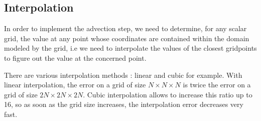 \documentclass[accepted,single]{gipaper}
\begin{document}
\subsection{Interpolation}


In order to implement the advection step, we need to determine, for any scalar grid, the value at any point whose coordinates are contained within the domain modeled by the grid, i.e we need to interpolate the values of the closest gridpoints to figure out the value at the concerned point. 

There are various interpolation methods : linear and cubic for example. With linear interpolation, the error on a grid of size $N \times N \times N$ is twice the error on a grid of size $2N \times 2N \times 2N$. Cubic interpolation allows to increase this ratio up to 16, so as soon as the grid size increases, the interpolation error decreases very fast.
\end{document}
